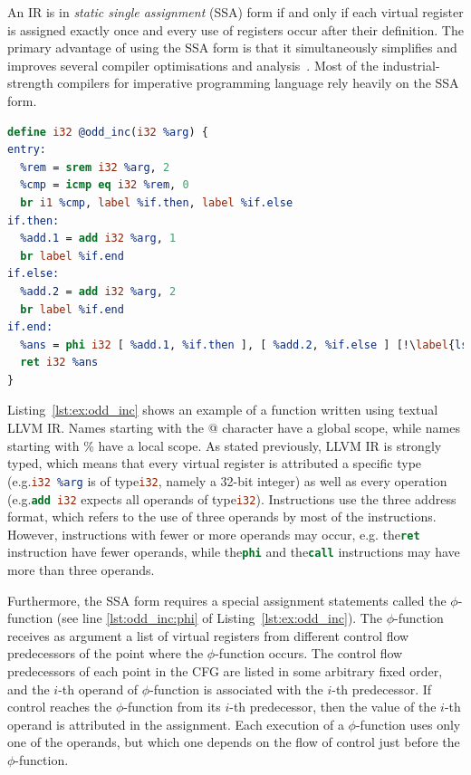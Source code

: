 An IR is in \textit{static single assignment} (SSA) form if and only if each virtual register is assigned exactly once and every use of registers occur after their definition.
The primary advantage of using the SSA form is that it simultaneously simplifies and improves several compiler optimisations and analysis~\citep{alpern88,cytron91}.
Most of the industrial-strength compilers for imperative programming language rely heavily on the SSA form.

\begin{lstlisting}[language=llvm,style=nasm,caption={An illustrative example of a function in textual LLVM IR. This function returns the argument incremented by one if it is even or by two if it is an odd integer.}, label={lst:ex:odd_inc}]
define i32 @odd_inc(i32 %arg) {
entry:
  %rem = srem i32 %arg, 2
  %cmp = icmp eq i32 %rem, 0
  br i1 %cmp, label %if.then, label %if.else
if.then:
  %add.1 = add i32 %arg, 1
  br label %if.end
if.else:
  %add.2 = add i32 %arg, 2
  br label %if.end
if.end:
  %ans = phi i32 [ %add.1, %if.then ], [ %add.2, %if.else ] [!\label{lst:odd_inc:phi}!]
  ret i32 %ans
}
\end{lstlisting}

Listing~\ref{lst:ex:odd_inc} shows an example of a function written using textual LLVM IR.
Names starting with the @ character have a global scope, while names starting with \% have a local scope.
As stated previously, LLVM IR is strongly typed, which means that every virtual register is attributed a specific type (e.g.\lstinline[language=llvm,style=nasm]{i32 %arg} is of type\lstinline[language=llvm,style=nasm]{i32}, namely a 32-bit integer) as well as every operation (e.g.\lstinline[language=llvm,style=nasm]{add i32} expects all operands of type\lstinline[language=llvm,style=nasm]{i32}).
Instructions use the three address format, which refers to the use of three operands by most of the instructions.
However, instructions with fewer or more operands may occur, e.g. the\lstinline[language=llvm,style=nasm]{ret} instruction have fewer operands, while the\lstinline[language=llvm,style=nasm]{phi} and the\lstinline[language=llvm,style=nasm]{call} instructions may have more than three operands.

Furthermore, the SSA form requires a special assignment statements called the $\phi$-function (see line \ref{lst:odd_inc:phi} of Listing~\ref{lst:ex:odd_inc}).
The $\phi$-function receives as argument a list of virtual registers from different  control flow predecessors of the point where the $\phi$-function occurs.
The control flow predecessors of each point in the CFG are listed in some arbitrary fixed order, and the $i$-th operand of $\phi$-function is associated with the $i$-th predecessor.
If control reaches the $\phi$-function from its $i$-th predecessor, then the value of the $i$-th operand is attributed in the assignment.
Each execution of a $\phi$-function uses only one of the operands, but which one depends on the flow of control just before the $\phi$-function.

